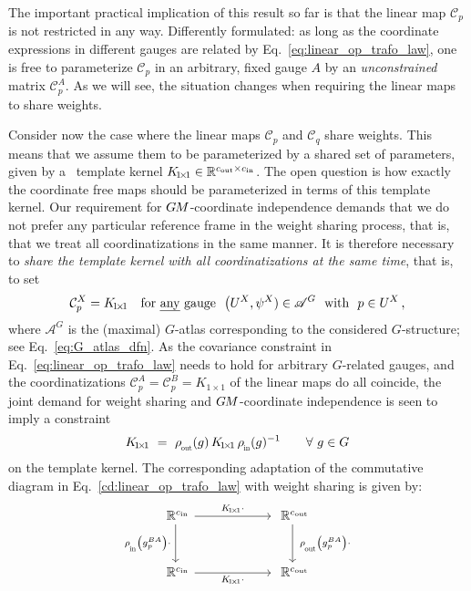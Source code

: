 The important practical implication of this result so far is that the linear map $\mathcal{C}_p$ is not restricted in any way.
Differently formulated: as long as the coordinate expressions in different gauges are related by Eq.~\eqref{eq:linear_op_trafo_law}, one is free to parameterize $\mathcal{C}_p$ in an arbitrary, fixed gauge $A$ by an \emph{unconstrained} matrix $\mathcal{C}_p^A$.
As we will see, the situation changes when requiring the linear maps to share weights.


Consider now the case where the linear maps $\mathcal{C}_p$ and $\mathcal{C}_q$ share weights.
This means that we assume them to be parameterized by a shared set of parameters, given by a \onexone\ template kernel $K_{\!1\!\times\!1} \in \mathbb{R}^{{c_\textup{out}}\times{c_\textup{in}}}$.
The open question is how exactly the coordinate free maps should be parameterized in terms of this template kernel.
Our requirement for $G\mkern-1.4muM$-coordinate independence demands that we do not prefer any particular reference frame in the weight sharing process, that is, that we treat all coordinatizations in the same manner.
It is therefore necessary to \emph{share the template kernel with all coordinatizations at the same time}, that is, to set
\begin{align}\label{eq:weight_sharing_1x1}
    \mathcal{C}_p^X = K_{\!1\!\times\!1}
    \quad \textup{for \emph{any} gauge}\ \ \big(U^X,\psi^X) \in \mathscr{A}^G\ \ \textup{with}\ \ p\in U^X \,,
\end{align}
where $\mathscr{A}^G$ is the (maximal) $G$-atlas corresponding to the considered $G$-structure; see Eq.~\eqref{eq:G_atlas_dfn}.
As the covariance constraint in Eq.~\eqref{eq:linear_op_trafo_law} needs to hold for arbitrary $G$-related gauges, and the coordinatizations $\mathcal{C}_p^A = \mathcal{C}_p^B = K_{\!1\!\times\!1}$ of the linear maps do all coincide, the joint demand for weight sharing and $G\mkern-1.4muM$-coordinate independence is seen to imply a constraint
\begin{align}\label{eq:Konexone_constraint_intertwiner}
    K_{\!1\!\times\!1}\ =\ \rhoout(g)\, K_{\!1\!\times\!1}\, \rhoin(g)^{-1} \qquad \forall\ g\in G
\end{align}
on the template kernel.
The corresponding adaptation of the commutative diagram in Eq.~\eqref{cd:linear_op_trafo_law} with weight sharing is given by:
\begin{equation}
\begin{tikzcd}[column sep=60pt, row sep=30pt, font=\normalsize]
    \R^{\cin}
        \arrow[d, "\rhoin\big(g_p^{BA}\big)\cdot\,"']
        \arrow[r, "K_{\!1\!\times\!1} \cdot"]
    &
    \R^{\cout}
        \arrow[d, "\ \rhoout\big(g_p^{BA}\big) \cdot"]
    \\
    \R^{\cin}
        \arrow[r, "K_{\!1\!\times\!1} \cdot"']
    &
    \R^{\cout}
\end{tikzcd}
\end{equation}


